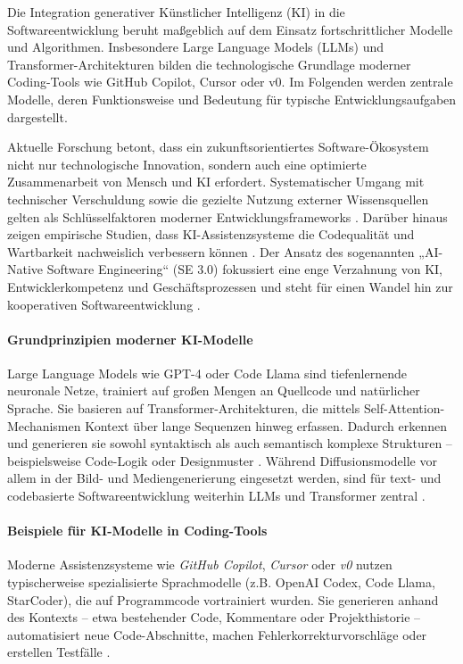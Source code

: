 Die Integration generativer Künstlicher Intelligenz (KI) in die
Softwareentwicklung beruht maßgeblich auf dem Einsatz fortschrittlicher Modelle
und Algorithmen. Insbesondere Large Language Models (LLMs) und
Transformer-Architekturen bilden die technologische Grundlage moderner
Coding-Tools wie GitHub Copilot, Cursor oder v0. Im Folgenden werden zentrale
Modelle, deren Funktionsweise und Bedeutung für typische Entwicklungsaufgaben
dargestellt.

Aktuelle Forschung betont, dass ein zukunftsorientiertes Software-Ökosystem
nicht nur technologische Innovation, sondern auch eine optimierte
Zusammenarbeit von Mensch und KI erfordert. Systematischer Umgang mit
technischer Verschuldung sowie die gezielte Nutzung externer Wissensquellen
gelten als Schlüsselfaktoren moderner Entwicklungsframeworks
\cite{matsumoto_conceptual_2021}. Darüber hinaus zeigen empirische Studien,
dass KI-Assistenzsysteme die Codequalität und Wartbarkeit nachweislich
verbessern können \cite{martinovic_impact_2024}. Der Ansatz des sogenannten
„AI-Native Software Engineering“ (SE 3.0) fokussiert eine enge Verzahnung von
KI, Entwicklerkompetenz und Geschäftsprozessen und steht für einen Wandel hin
zur kooperativen Softwareentwicklung \cite{hassan_towards_2024}.

\paragraph{Grundprinzipien moderner KI-Modelle}
Large Language Models wie GPT-4 oder Code Llama sind tiefenlernende neuronale
Netze, trainiert auf großen Mengen an Quellcode und natürlicher Sprache. Sie
basieren auf Transformer-Architekturen, die mittels Self-Attention-Mechanismen
Kontext über lange Sequenzen hinweg erfassen. Dadurch erkennen und generieren
sie sowohl syntaktisch als auch semantisch komplexe Strukturen – beispielsweise
Code-Logik oder Designmuster \cite{nguyen-duc_generative_2023,
    esposito_generative_2025}. Während Diffusionsmodelle vor allem in der Bild- und
Mediengenerierung eingesetzt werden, sind für text- und codebasierte
Softwareentwicklung weiterhin LLMs und Transformer zentral
\cite{weisz_design_2024}.

\paragraph{Beispiele für KI-Modelle in Coding-Tools}
Moderne Assistenzsysteme wie \textit{GitHub Copilot}, \textit{Cursor} oder
\textit{v0} nutzen typischerweise spezialisierte Sprachmodelle (z.B. OpenAI
Codex, Code Llama, StarCoder), die auf Programmcode vortrainiert wurden. Sie
generieren anhand des Kontexts – etwa bestehender Code, Kommentare oder
Projekthistorie – automatisiert neue Code-Abschnitte, machen
Fehlerkorrekturvorschläge oder erstellen Testfälle \cite{coutinho_role_2024,
    esposito_generative_2025}.

